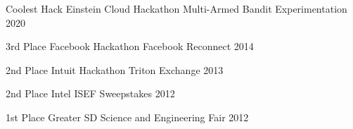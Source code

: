 

\begin{cvhonors}
  \cvhonor
    {Coolest Hack}
    {Einstein Cloud Hackathon}
    {Multi-Armed Bandit Experimentation}
    {2020}

  \cvhonor
    {3rd Place}
    {Facebook Hackathon}
    {Facebook Reconnect}
    {2014}

  \cvhonor
    {2nd Place}
    {Intuit Hackathon}
    {Triton Exchange}
    {2013}

  \cvhonor
    {2nd Place}
    {Intel ISEF Sweepstakes}
    {}
    {2012}

  \cvhonor
    {1st Place}
    {Greater SD Science and Engineering Fair}
    {}
    {2012}
\end{cvhonors}
